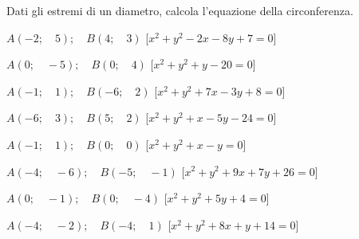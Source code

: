 \begin{esercizio}\label{ese:}
 Dati gli estremi di un diametro, calcola l'equazione della circonferenza.
 \begin{enumeratea}
  \item  \(A \left (-2; \quad 5 \right ); \quad B \left (4; \quad 3 \right )\)
   \hfill [\(x^2 + y^2 -2x -8y +7 = 0\)]
  \item  \(A \left (0; \quad -5 \right ); \quad B \left (0; \quad 4 \right )\)
   \hfill [\(x^2 + y^2 +y -20 = 0\)]
  \item  \(A \left (-1; \quad 1 \right ); \quad B \left (-6; \quad 2 \right )\)
   \hfill [\(x^2 + y^2 +7x -3y +8 = 0\)]
  \item  \(A \left (-6; \quad 3 \right ); \quad B \left (5; \quad 2 \right )\)
   \hfill [\(x^2 + y^2 +x -5y -24 = 0\)]
  \item  \(A \left (-1; \quad 1 \right ); \quad B \left (0; \quad 0 \right )\)
   \hfill [\(x^2 + y^2 +x -y  = 0\)]
  \item  \(A \left (-4; \quad -6 \right ); \quad B \left (-5; \quad -1 \right 
)\)
   \hfill [\(x^2 + y^2 +9x +7y +26 = 0\)]
  \item  \(A \left (0; \quad -1 \right ); \quad B \left (0; \quad -4 \right )\)
   \hfill [\(x^2 + y^2 +5y +4 = 0\)]
  \item  \(A \left (-4; \quad -2 \right ); \quad B \left (-4; \quad 1 \right )\)
   \hfill [\(x^2 + y^2 +8x +y +14 = 0\)]
 \end{enumeratea}
\end{esercizio}



